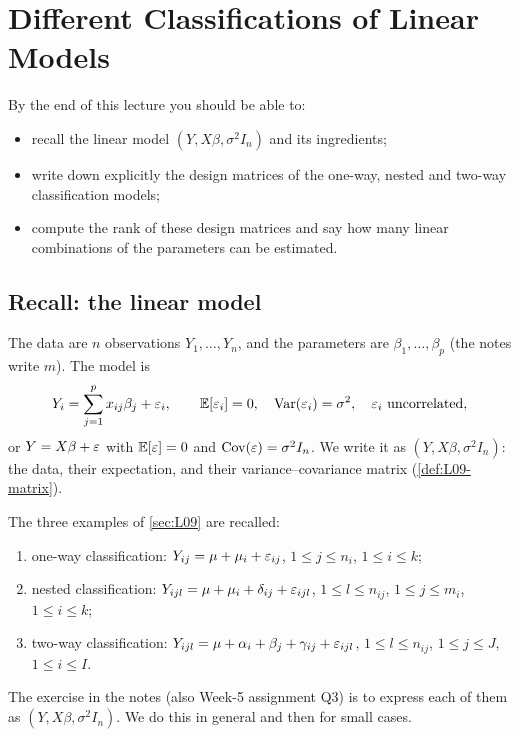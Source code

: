 \section{Different Classifications of Linear Models}\label{sec:L11}


\begin{guiding*}
By the end of this lecture you should be able to:
\begin{itemize}
  \item recall the linear model $(Y,X\beta,\sigma^2I_n)$ and its ingredients;
  \item write down explicitly the design matrices of the one-way, nested and two-way classification models;
  \item compute the rank of these design matrices and say how many linear combinations of the parameters can be estimated.
\end{itemize}
\end{guiding*}

\subsection{Recall: the linear model}
The data are $n$ observations $Y_1,\dots,Y_n$, and the parameters are $\beta_1,\dots,\beta_p$ (the
notes write $m$). The model is
\[
Y_i=\sum_{j=1}^p x_{ij}\beta_j+\varepsilon_i,\qquad \mathbb E[\varepsilon_i]=0,\quad \operatorname{Var}(\varepsilon_i)=\sigma^2,\quad \varepsilon_i\text{ uncorrelated},
\]
or $Y=X\beta+\varepsilon$ with $\mathbb E[\varepsilon]=0$ and $\operatorname{Cov}(\varepsilon)=\sigma^2I_{n}$. We write it as
$(Y,X\beta,\sigma^2I_n)$: the data, their expectation, and their variance--covariance matrix
(\cref{def:L09-matrix}).

The three examples of \cref{sec:L09} are recalled:
\begin{enumerate}
  \item one-way classification: $Y_{ij}=\mu+\mu_i+\varepsilon_{ij}$, $1\le j\le n_i$, $1\le i\le k$;
  \item nested classification: $Y_{ijl}=\mu+\mu_i+\delta_{ij}+\varepsilon_{ijl}$, $1\le l\le n_{ij}$, $1\le j\le m_i$, $1\le i\le k$;
  \item two-way classification: $Y_{ijl}=\mu+\alpha_i+\beta_j+\gamma_{ij}+\varepsilon_{ijl}$, $1\le l\le n_{ij}$, $1\le j\le J$, $1\le i\le I$.
\end{enumerate}
The exercise in the notes (also Week-5 assignment Q3) is to express each of them as
$(Y,X\beta,\sigma^2I_n)$. We do this in general and then for small cases.

